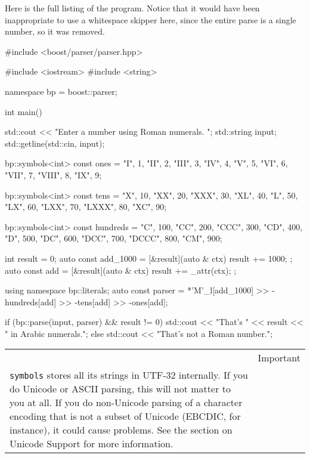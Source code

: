 Here is the full listing of the program. Notice that it would have been inappropriate to use a whitespace skipper here, since the entire parse is a single number, so it was removed.

\begin{code}
#include <boost/parser/parser.hpp>

#include <iostream>
#include <string>


namespace bp = boost::parser;

int main()
{
    std::cout << "Enter a number using Roman numerals. ";
    std::string input;
    std::getline(std::cin, input);

    bp::symbols<int> const ones = {
        {"I", 1},
        {"II", 2},
        {"III", 3},
        {"IV", 4},
        {"V", 5},
        {"VI", 6},
        {"VII", 7},
        {"VIII", 8},
        {"IX", 9}};

    bp::symbols<int> const tens = {
        {"X", 10},
        {"XX", 20},
        {"XXX", 30},
        {"XL", 40},
        {"L", 50},
        {"LX", 60},
        {"LXX", 70},
        {"LXXX", 80},
        {"XC", 90}};

    bp::symbols<int> const hundreds = {
        {"C", 100},
        {"CC", 200},
        {"CCC", 300},
        {"CD", 400},
        {"D", 500},
        {"DC", 600},
        {"DCC", 700},
        {"DCCC", 800},
        {"CM", 900}};

    int result = 0;
    auto const add_1000 = [&result](auto & ctx) { result += 1000; };
    auto const add = [&result](auto & ctx) { result += _attr(ctx); };

    using namespace bp::literals;
    auto const parser =
        *'M'_l[add_1000] >> -hundreds[add] >> -tens[add] >> -ones[add];

    if (bp::parse(input, parser) && result != 0)
        std::cout << "That's " << result << " in Arabic numerals.\n";
    else
        std::cout << "That's not a Roman number.\n";
}
\end{code}

\begin{longtable}[]{@{}
  >{\raggedright\arraybackslash}p{}
  >{\raggedright\arraybackslash}p{}@{}}
\toprule\noalign{}
\endhead
\bottomrule\noalign{}
\endlastfoot
\begin{minipage}[t]{\linewidth}\raggedright
\end{minipage} & Important \\
\texttt{symbols} stores all its strings in UTF-32 internally. If you do Unicode or ASCII parsing, this will not matter to you at all. If you do non-Unicode parsing of a character encoding that is not a subset of Unicode (EBCDIC, for instance), it could cause problems. See the section on Unicode Support for more information. & \\
\end{longtable}

